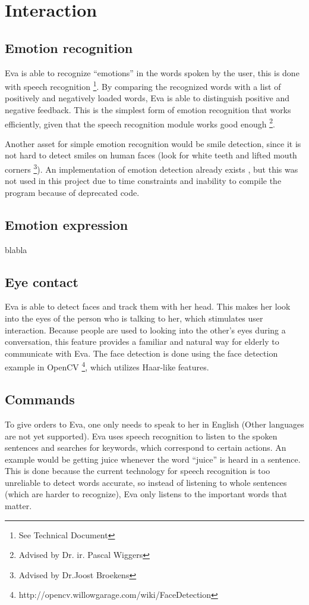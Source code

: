 \documentclass[project_eva.tex]{subfiles}
\begin{document}
\section*{Interaction}

\subsection*{Emotion recognition}
Eva is able to recognize ``emotions'' in the words spoken by the user, this is done with speech recognition \footnote{See 
Technical Document}. By comparing the recognized words with a list of positively and 
negatively loaded words, Eva is able to distinguish positive and negative feedback. This is the simplest form of emotion 
recognition that works efficiently, given that the speech recognition module works good enough \footnote{Advised by Dr. ir. 
Pascal Wiggers}. 

Another asset for simple emotion recognition would be smile detection, since it is not hard to detect smiles on human faces 
(look for white teeth and lifted mouth corners \footnote{Advised by Dr.Joost Broekens}). An implementation of emotion 
detection already exists \cite{autosmiley}, but this was not used in this project due to time 
constraints and inability to compile the program because of deprecated code.
 
\subsection*{Emotion expression}
blabla 

\subsection*{Eye contact}
Eva is able to detect faces and track them with her head. This makes her look into the eyes of the person who is talking to 
her, which stimulates user interaction. Because people are used to looking into the other's eyes during a conversation, 
this feature provides a familiar and natural way for elderly to communicate with Eva. The face detection is done using the face detection example in OpenCV \footnote{http://opencv.willowgarage.com/wiki/FaceDetection}, which utilizes Haar-like features.

\subsection*{Commands}
To give orders to Eva, one only needs to speak to her in English (Other languages are not yet supported). Eva uses speech 
recognition to listen to the spoken sentences and searches for keywords, which correspond to certain actions. An example 
would be getting juice whenever the word ``juice'' is heard in a sentence. This is done because the current technology for 
speech recognition is too unreliable to detect words accurate, so instead of listening to whole sentences (which are harder 
to recognize), Eva only listens to the important words that matter.
\end{document}
